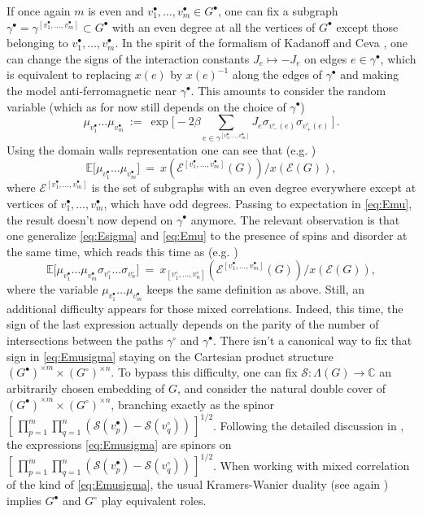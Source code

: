 \documentclass[reqno]{amsart}
\numberwithin{equation}{section}
\theoremstyle{definition}
\theoremstyle{remark}
\newcommand\C{\mathbb{C}}
\newcommand\cE{\mathcal{E}}
\newcommand\cS{\mathcal{S}}
\newcommand\vcirc[1]{v^\circ_1,\ldots,v^\circ_{#1}}
\newcommand\svcirc[1]{\sigma_{v^\circ_1}\ldots \sigma_{v^\circ_{#1}}}
\newcommand\vbullet[1]{v^\bullet_1,\ldots,v^\bullet_{#1}}
\newcommand\muvbullet[1]{\mu_{v^\bullet_1}\ldots\mu_{v^\bullet_{#1}}}
\begin{document}
If once again $m$ is even and $\vbullet{m}\in G^\bullet$, one can fix a subgraph $\gamma^\bullet=\gamma^{[\vbullet{m}]}\subset G^\bullet$ with an  even degree at all the vertices of $G^\bullet$ except those belonging to $\vbullet{m}$. In the spirit of the formalism of Kadanoff and Ceva \cite{kadanoff-ceva}, one can change the signs of the interaction constants $J_e\mapsto -J_e$ on edges $e\in\gamma^\bullet$, which is equivalent to replacing $x(e)$ by $x(e)^{-1}$ along the edges of $\gamma^\bullet$ and making the model anti-ferromagnetic near $\gamma^\bullet$. This amounts to consider the random variable (which as for now still depends on the choice of $\gamma^\bullet$)
\[
\textstyle \muvbullet{m}\ :=\ \exp\big[-2\beta\sum_{e\in\gamma^{[\vbullet{m}]}}J_e\sigma_{v^\circ_-(e)}\sigma_{v^\circ_+(e)}\,\big]\,.
\]
Using the domain walls representation one can see that (e.g. \cite[Proposition 1.3]{CCK})
\begin{equation}
\label{eq:Emu}
\textstyle \mathbb E\big[\muvbullet{m}\big]\ =\ x(\cE^{[\vbullet{m}]}(G))\big/{x(\cE(G))},
\end{equation}
where $\cE^{[\vbullet{m}]}$ is the set of subgraphs with an even degree everywhere except at vertices of $\vbullet{m}$, which have odd degrees. Passing to expectation in \eqref{eq:Emu}, the result doesn't now depend on $\gamma^\bullet$ anymore. The relevant observation is that one generalize \eqref{eq:Esigma} and \eqref{eq:Emu} to the presence of spins and disorder at the same time, which reads this time as (e.g. \cite[Proposition 3.3]{CCK})
\begin{equation}
\label{eq:Emusigma}
\textstyle \mathbb E\big[\muvbullet{m}\svcirc{n}\big]\ =\ x_{[\vcirc{n}]}(\cE^{[\vbullet{m}]}(G))\big/{x(\cE(G))},
\end{equation}
where the variable $\muvbullet{m}$ keeps the same definition as above. Still, an additional difficulty appears for those mixed correlations. Indeed, this time, the sign of the last expression actually depends on the parity of the number of intersections between the paths $\gamma^\circ$ and $\gamma^\bullet$. There isn't a canonical way to fix that sign in \eqref{eq:Emusigma} staying on the Cartesian product structure $(G^\bullet)^{\times m}\!\times (G^\circ)^{\times n}$. To bypass this difficulty, one can fix $\cS:\Lambda(G)\to\C$ an arbitrarily chosen embedding of $G$, and consider the natural double cover of $(G^\bullet)^{\times m}\!\times (G^\circ)^{\times n}$, branching exactly as the spinor $[\,\prod_{p=1}^m\prod_{q=1}^n(\cS(v^\bullet_p)-\cS(v^\circ_q))\,]^{1/2}$. Following the detailed discussion in \cite[Section 2.2]{CHI-mixed}, the expressions \eqref{eq:Emusigma} are spinors on $[\,\prod_{p=1}^m\prod_{q=1}^n(\cS(v^\bullet_p)-\cS(v^\circ_q))\,]^{1/2}$. When working with mixed correlation of the kind of \eqref{eq:Emusigma}, the usual Kramers-Wanier duality (see again \cite[Proposition 3.3]{CCK}) implies  $G^\bullet$ and $G^\circ$ play equivalent roles.
\end{document}
